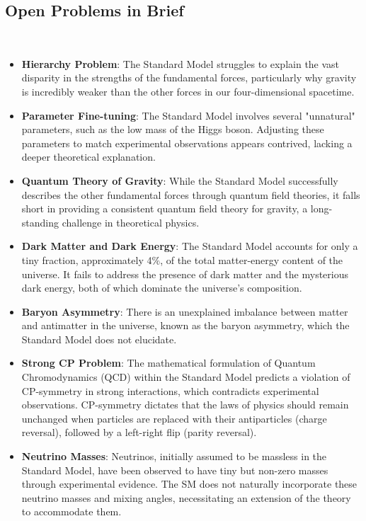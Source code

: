 \subsection{Open Problems in Brief}~\label{sec:Open Problems}
\begin{itemize}
    \item  \textbf{Hierarchy Problem}: The Standard Model struggles to explain the vast disparity in the strengths of the fundamental forces, particularly why gravity is incredibly weaker than the other forces in our four-dimensional spacetime.
    \item \textbf{Parameter Fine-tuning}: The Standard Model involves several "unnatural" parameters, such as the low mass of the Higgs boson. Adjusting these parameters to match experimental observations appears contrived, lacking a deeper theoretical explanation.
    \item  \textbf{Quantum Theory of Gravity}: While the Standard Model successfully describes the other fundamental forces through quantum field theories, it falls short in providing a consistent quantum field theory for gravity, a long-standing challenge in theoretical physics.
    \item \textbf{Dark Matter and Dark Energy}: The Standard Model accounts for only a tiny fraction, approximately 4$\%$, of the total matter-energy content of the universe. It fails to address the presence of dark matter and the mysterious dark energy, both of which dominate the universe's composition.
    \item \textbf{Baryon Asymmetry}: There is an unexplained imbalance between matter and antimatter in the universe, known as the baryon asymmetry, which the Standard Model does not elucidate.
    \item \textbf{Strong CP Problem}: The mathematical formulation of Quantum Chromodynamics (QCD) within the Standard Model predicts a violation of CP-symmetry in strong interactions, which contradicts experimental observations. CP-symmetry dictates that the laws of physics should remain unchanged when particles are replaced with their antiparticles (charge reversal), followed by a left-right flip (parity reversal).
    \item \textbf{Neutrino Masses}: Neutrinos, initially assumed to be massless in the Standard Model, have been observed to have tiny but non-zero masses through experimental evidence. The SM does not naturally incorporate these neutrino masses and mixing angles, necessitating an extension of the theory to accommodate them.
    
\end{itemize}

